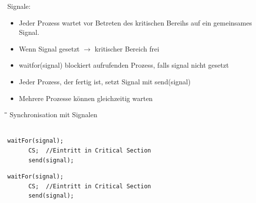 Signale:
\begin{itemize}
  \item Jeder Prozess wartet vor Betreten des kritischen Bereihs auf ein
  gemeinsames Signal. 
  \item Wenn Signal gesetzt $\rightarrow$ kritischer Bereich frei
  \item waitfor(signal) blockiert aufrufenden Prozess, falls signal nicht
  gesetzt
  \item Jeder Prozess, der fertig ist, setzt Signal mit send(signal)
  \item Mehrere Prozesse können gleichzeitig warten 
\end{itemize}

\begin{tabbing}
  \hspace*{1cm}\=\hspace*{4.2cm}\=\hspace*{3cm}\=\hspace*{2.7cm}\= \kill
  Synchronisation mit Signalen\\
   \> \> \\
  \>\begin{lstlisting}[style=C]
      waitFor(signal); 
      CS;  //Eintritt in Critical Section 
      send(signal); 
    \end{lstlisting} \> \> \>
    \begin{lstlisting}[style=C]
      waitFor(signal); 
      CS;  //Eintritt in Critical Section 
      send(signal); 
    \end{lstlisting} \\\\
 \end{tabbing}
 
